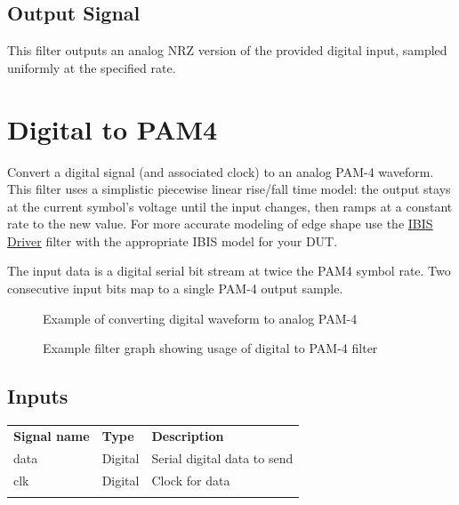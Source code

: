 \subsection{Output Signal}

This filter outputs an analog NRZ version of the provided digital input, sampled uniformly at the specified rate.

\pagebreak
\section{Digital to PAM4}
\label{filter:digitaltopam4}

Convert a digital signal (and associated clock) to an analog PAM-4 waveform. This filter uses a simplistic piecewise
linear rise/fall time model: the output stays at the current symbol's voltage until the input changes, then ramps at a
constant rate to the new value. For more accurate modeling of edge shape use the \hyperref[filter:ibisdriver]{IBIS
Driver} filter with the appropriate IBIS model for your DUT.

The input data is a digital serial bit stream at twice the PAM4 symbol rate. Two consecutive input bits map to a single
PAM-4 output sample.

\begin{figure}[h]
\centering
{}
\caption{Example of converting digital waveform to analog PAM-4}
\label{filter_digital_to_pam4}
\end{figure}

\begin{figure}[h]
\centering
{}
\caption{Example filter graph showing usage of digital to PAM-4 filter}
\label{filter_digital_to_pam4_graph}
\end{figure}

\FloatBarrier

\subsection{Inputs}

\begin{tabularx}{16cm}{llX}
\thickhline
\textbf{Signal name} & \textbf{Type} & \textbf{Description} \\
\thickhline
data & Digital & Serial digital data to send\\
\thinhline
clk & Digital & Clock for data\\
\thickhline
\end{tabularx}

